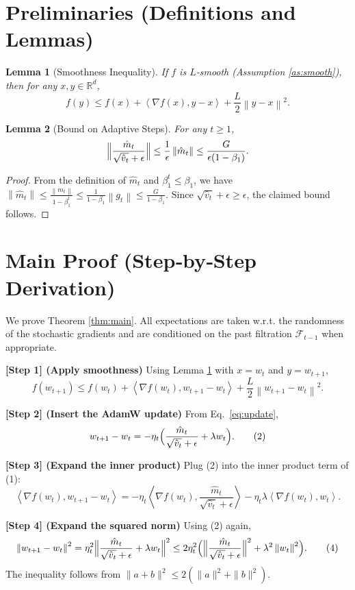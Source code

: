 \documentclass{article}
\newtheorem{lemma}{Lemma}
\newcommand{\RR}{\mathbb{R}}
\newcommand{\norm}[1]{\left\|#1\right\|}
\newcommand{\ip}[2]{\left\langle #1,#2\right\rangle}
\begin{document}
\newpage
\section*{Preliminaries (Definitions and Lemmas)}
\begin{lemma}[Smoothness Inequality]\label{lem:smooth}
If $f$ is $L$‑smooth (Assumption \ref{as:smooth}), then for any $x,y\in\RR^{d}$,
\[
f(y)\le f(x)+\ip{\nabla f(x)}{y-x}+\frac{L}{2}\norm{y-x}^2 .
\]
\end{lemma}
\begin{lemma}[Bound on Adaptive Steps]\label{lem:adapt}
For any $t\ge1$,
\[
\Bigl\|\frac{\hat m_t}{\sqrt{\hat v_t}+\epsilon}\Bigr\|
\le \frac{1}{\epsilon}\norm{\hat m_t}
\le \frac{G}{\epsilon(1-\beta_1)} .
\]
\end{lemma}
\begin{proof}
From the definition of $\hat m_t$ and $\beta_1^{t}\le\beta_1$, we have
$\norm{\hat m_t}\le \frac{\norm{m_t}}{1-\beta_1^t}
\le \frac{1}{1-\beta_1}\norm{g_t}
\le \frac{G}{1-\beta_1}$.
Since $\sqrt{\hat v_t}+\epsilon\ge\epsilon$, the claimed bound follows. \qedhere
\end{proof}

\section*{Main Proof (Step‑by‑Step Derivation)}
We prove Theorem \ref{thm:main}. All expectations are taken w.r.t. the randomness of the stochastic gradients and are conditioned on the past filtration $\mathcal{F}_{t-1}$ when appropriate.

\noindent\textbf{[Step 1] (Apply smoothness)}  
Using Lemma \ref{lem:smooth} with $x=w_t$ and $y=w_{t+1}$,
\[
f(w_{t+1})\le f(w_t)+\ip{\nabla f(w_t)}{w_{t+1}-w_t}
+\frac{L}{2}\norm{w_{t+1}-w_t}^2 . \tag{1}
\]

\noindent\textbf{[Step 2] (Insert the AdamW update)}  
From Eq.~\eqref{eq:update},
\[
w_{t+1}-w_t = -\eta_t\Bigl(\frac{\hat m_t}{\sqrt{\hat v_t}+\epsilon}+\lambda w_t\Bigr). \tag{2}
\]

\noindent\textbf{[Step 3] (Expand the inner product)}  
Plug (2) into the inner product term of (1):
\[
\ip{\nabla f(w_t)}{w_{t+1}-w_t}
= -\eta_t\ip{\nabla f(w_t)}{\frac{\hat m_t}{\sqrt{\hat v_t}+\epsilon}}
-\eta_t\lambda\ip{\nabla f(w_t)}{w_t}. \tag{3}
\]

\noindent\textbf{[Step 4] (Expand the squared norm)}  
Using (2) again,
\[
\norm{w_{t+1}-w_t}^2
= \eta_t^{2}\Bigl\|
\frac{\hat m_t}{\sqrt{\hat v_t}+\epsilon}+\lambda w_t
\Bigr\|^{2}
\le 2\eta_t^{2}
\Bigl(
\Bigl\|\frac{\hat m_t}{\sqrt{\hat v_t}+\epsilon}\Bigr\|^{2}
+\lambda^{2}\norm{w_t}^{2}
\Bigr). \tag{4}
\]
The inequality follows from $\|a+b\|^{2}\le2(\|a\|^{2}+\|b\|^{2})$.
\end{document}
